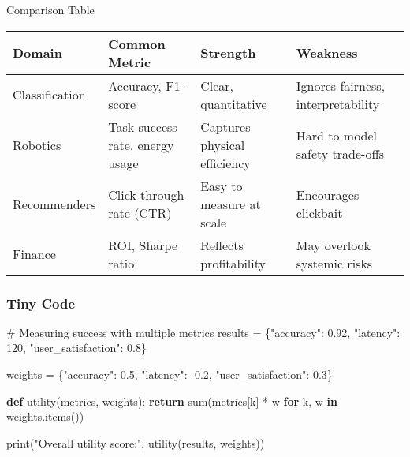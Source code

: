 \documentclass[
  letterpaper,
  DIV=11,
  numbers=noendperiod]{scrreprt}
\newenvironment{Shaded}{\begin{snugshade}}{\end{snugshade}}
\newcommand{\BuiltInTok}[1]{\textcolor[rgb]{0.00,0.23,0.31}{#1}}
\newcommand{\CommentTok}[1]{\textcolor[rgb]{0.37,0.37,0.37}{#1}}
\newcommand{\ControlFlowTok}[1]{\textcolor[rgb]{0.00,0.23,0.31}{\textbf{#1}}}
\newcommand{\DecValTok}[1]{\textcolor[rgb]{0.68,0.00,0.00}{#1}}
\newcommand{\FloatTok}[1]{\textcolor[rgb]{0.68,0.00,0.00}{#1}}
\newcommand{\KeywordTok}[1]{\textcolor[rgb]{0.00,0.23,0.31}{\textbf{#1}}}
\newcommand{\NormalTok}[1]{\textcolor[rgb]{0.00,0.23,0.31}{#1}}
\newcommand{\OperatorTok}[1]{\textcolor[rgb]{0.37,0.37,0.37}{#1}}
\newcommand{\StringTok}[1]{\textcolor[rgb]{0.13,0.47,0.30}{#1}}
\begin{document}
Comparison Table

\begin{longtable}[]{@{}
  >{\raggedright\arraybackslash}p{}
  >{\raggedright\arraybackslash}p{}
  >{\raggedright\arraybackslash}p{}
  >{\raggedright\arraybackslash}p{}@{}}
\toprule\noalign{}
\begin{minipage}[b]{\linewidth}\raggedright
Domain
\end{minipage} & \begin{minipage}[b]{\linewidth}\raggedright
Common Metric
\end{minipage} & \begin{minipage}[b]{\linewidth}\raggedright
Strength
\end{minipage} & \begin{minipage}[b]{\linewidth}\raggedright
Weakness
\end{minipage} \\
\midrule\noalign{}
\endhead
\bottomrule\noalign{}
\endlastfoot
Classification & Accuracy, F1-score & Clear, quantitative & Ignores
fairness, interpretability \\
Robotics & Task success rate, energy usage & Captures physical
efficiency & Hard to model safety trade-offs \\
Recommenders & Click-through rate (CTR) & Easy to measure at scale &
Encourages clickbait \\
Finance & ROI, Sharpe ratio & Reflects profitability & May overlook
systemic risks \\
\end{longtable}

\subsubsection{Tiny Code}\label{tiny-code-16}

\begin{Shaded}
\begin{Highlighting}[]
\CommentTok{\# Measuring success with multiple metrics}
\NormalTok{results }\OperatorTok{=}\NormalTok{ \{}\StringTok{"accuracy"}\NormalTok{: }\FloatTok{0.92}\NormalTok{, }\StringTok{"latency"}\NormalTok{: }\DecValTok{120}\NormalTok{, }\StringTok{"user\_satisfaction"}\NormalTok{: }\FloatTok{0.8}\NormalTok{\}}

\NormalTok{weights }\OperatorTok{=}\NormalTok{ \{}\StringTok{"accuracy"}\NormalTok{: }\FloatTok{0.5}\NormalTok{, }\StringTok{"latency"}\NormalTok{: }\OperatorTok{{-}}\FloatTok{0.2}\NormalTok{, }\StringTok{"user\_satisfaction"}\NormalTok{: }\FloatTok{0.3}\NormalTok{\}}

\KeywordTok{def}\NormalTok{ utility(metrics, weights):}
    \ControlFlowTok{return} \BuiltInTok{sum}\NormalTok{(metrics[k] }\OperatorTok{*}\NormalTok{ w }\ControlFlowTok{for}\NormalTok{ k, w }\KeywordTok{in}\NormalTok{ weights.items())}

\BuiltInTok{print}\NormalTok{(}\StringTok{"Overall utility score:"}\NormalTok{, utility(results, weights))}
\end{Highlighting}
\end{Shaded}
\end{document}

